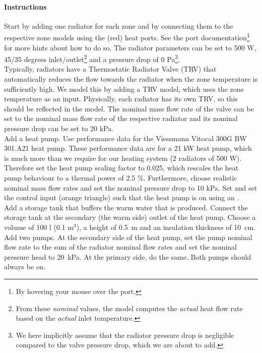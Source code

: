 \documentclass[10pt,a4paper]{article}
\begin{document}
\paragraph{Instructions}
Start by adding one radiator for each zone and by 
connecting them to the respective zone models using the (red) heat ports.
See the port documentation\footnote{By hovering your mouse over the port.} 
for more hints about how to do so.
The radiator parameters can be set to 500 W, 45/35 degrees inlet/outlet\footnote{From these \textit{nominal} values, the model computes the \textit{actual} heat flow rate based on the \textit{actual} inlet temperature.}
and a pressure drop of 0 Pa\footnote{We here implicitly assume that the radiator pressure drop is negligible compared to the valve pressure drop, which we are about to add.}.\\

Typically, radiators have a Thermostatic Radiator Valve (TRV)
that automatically reduces the flow towards the radiator
when the zone temperature is sufficiently high.
We model this by adding a TRV model, which uses
the zone temperature  as an input.
Physically, each radiator has its own TRV, 
so this should be reflected in the model.
The nominal mass flow rate of the valve can be set to the nominal
mass flow rate of the respective radiator and its nominal pressure drop can be set 
to 20 kPa.\\

Add a heat pump. 
Use performance data for the Viessmann Vitocal 300G BW 301.A21 heat pump.
These performance data are for a 21 kW heat pump, 
which is much more than we require for our heating system (2 radiators of 500 W).
Therefore set the heat pump scaling factor to 0.025, 
which rescales the heat pump behaviour to a thermal power of 2.5 \%.
Furthermore, choose realistic nominal mass flow rates and set the nominal pressure
drop to 10 kPa. Set  and set the control input (orange triangle)
such that the heat pump is on using an .\\

Add a storage tank that buffers the warm water that is produced.
Connect the storage tank at the secondary (the warm side) outlet of the heat pump.
Choose a volume of 100 l (0.1 m$^3$), a height of 0.5~m and an insulation thickness of 10~cm.\\

Add two pumps.
At the secondary side of the heat pump, 
set the pump nominal flow rate to the sum of the radiator nominal flow rates
and set the nominal pressure head to 20~kPa.
At the primary side, do the same.
Both pumps should always be on.\\
\end{document}
